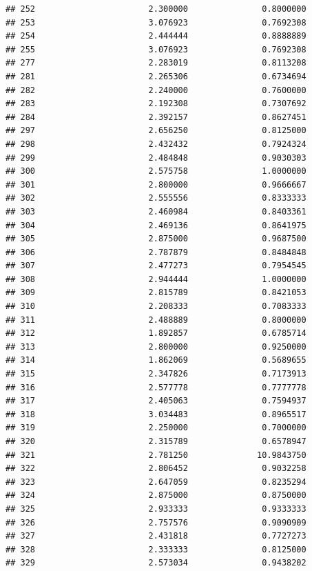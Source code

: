 \documentclass[]{article}
\begin{document}
\begin{verbatim}
## 252                       2.300000               0.8000000
## 253                       3.076923               0.7692308
## 254                       2.444444               0.8888889
## 255                       3.076923               0.7692308
## 277                       2.283019               0.8113208
## 281                       2.265306               0.6734694
## 282                       2.240000               0.7600000
## 283                       2.192308               0.7307692
## 284                       2.392157               0.8627451
## 297                       2.656250               0.8125000
## 298                       2.432432               0.7924324
## 299                       2.484848               0.9030303
## 300                       2.575758               1.0000000
## 301                       2.800000               0.9666667
## 302                       2.555556               0.8333333
## 303                       2.460984               0.8403361
## 304                       2.469136               0.8641975
## 305                       2.875000               0.9687500
## 306                       2.787879               0.8484848
## 307                       2.477273               0.7954545
## 308                       2.944444               1.0000000
## 309                       2.815789               0.8421053
## 310                       2.208333               0.7083333
## 311                       2.488889               0.8000000
## 312                       1.892857               0.6785714
## 313                       2.800000               0.9250000
## 314                       1.862069               0.5689655
## 315                       2.347826               0.7173913
## 316                       2.577778               0.7777778
## 317                       2.405063               0.7594937
## 318                       3.034483               0.8965517
## 319                       2.250000               0.7000000
## 320                       2.315789               0.6578947
## 321                       2.781250              10.9843750
## 322                       2.806452               0.9032258
## 323                       2.647059               0.8235294
## 324                       2.875000               0.8750000
## 325                       2.933333               0.9333333
## 326                       2.757576               0.9090909
## 327                       2.431818               0.7727273
## 328                       2.333333               0.8125000
## 329                       2.573034               0.9438202

\end{verbatim}
\end{document}
